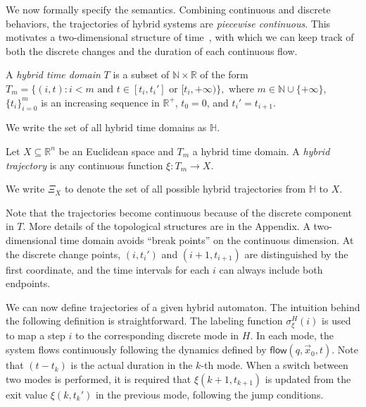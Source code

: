 \documentclass[envcountsect]{llncs}
\newcommand{\flow}{\mathsf{flow}}
\begin{document}
We now formally specify the semantics. Combining continuous and discrete
behaviors, the trajectories of hybrid systems are {\em piecewise continuous}.
This motivates a two-dimensional structure of time~\cite{}, with which we can
keep track of both the discrete changes and the duration of each continuous
flow.
\begin{definition}
A {\em hybrid time domain} $T$ is a subset of
 $\mathbb{N}\times \mathbb{R}$ of the form
$T_m=\{(i, t): i<m \mbox{ and } t\in [t_i, t_i']\mbox{ or }[t_i, +\infty)\},$
where $m\in \mathbb{N}\cup\{+\infty\}$, $\{t_i\}_{i=0}^m$ is an
increasing sequence in $\mathbb{R}^+$, $t_0= 0$, and $t_i'=t_{i+1}$.
\end{definition}
We write the set of all hybrid time domains as $\mathbb{H}$.
\begin{definition}
Let $X\subseteq\mathbb{R}^n$ be an Euclidean space and $T_m$ a hybrid
time domain. A {\em hybrid trajectory} is any continuous function $\xi: T_m
\rightarrow X.$
 \end{definition}
We write $\Xi_X$ to denote the set of all possible hybrid trajectories from
$\mathbb{H}$ to $X$.
 \begin{remark}
Note that the trajectories become continuous because of the discrete component
in $T$. More details of the topological structures are in the
Appendix. A two-dimensional time domain avoids ``break points'' on the
continuous dimension. At the discrete change points, $(i,t_i')$ and $(i+1,
t_{i+1})$ are distinguished by the first coordinate, and the time intervals for
each $i$ can
always include both endpoints.
\end{remark}

We can now define trajectories of a given hybrid automaton. The intuition behind
the following definition is straightforward. The labeling function
$\sigma_{\xi}^H(i)$ is used to map a step $i$ to the corresponding discrete mode
in $H$. In each mode, the system flows continuously following the dynamics
defined by $\flow(q, \vec x_0, t)$. Note that $(t-t_k)$ is the actual duration
in the $k$-th mode. When a switch between two modes is performed, it is required
that $\xi(k+1, t_{k+1})$ is updated from the exit value $\xi(k, t_k')$ in the
previous mode, following the jump conditions.
\end{document}
